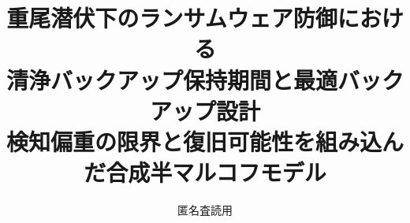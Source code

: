 \title{重尾潜伏下のランサムウェア防御における\\
清浄バックアップ保持期間と最適バックアップ設計\\
\large 検知偏重の限界と復旧可能性を組み込んだ合成半マルコフモデル}
\author{匿名査読用}
\date{}
